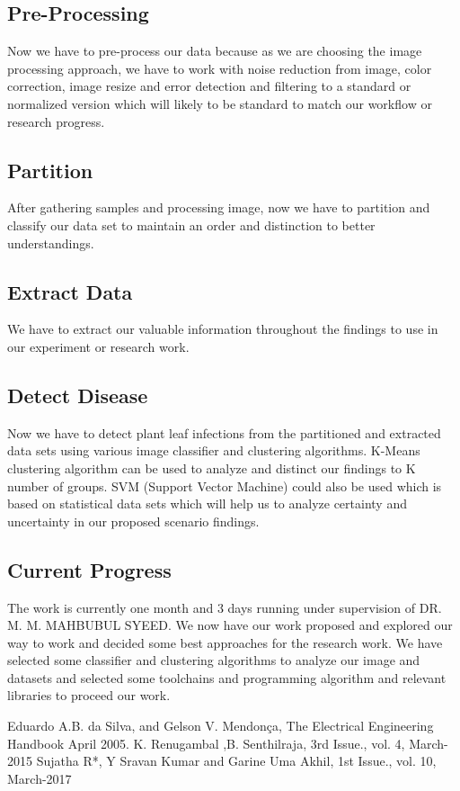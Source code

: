 \documentclass[conference]{IEEEtran}
\begin{document}
\subsection{Pre-Processing}
Now we have to pre-process our data because as we are choosing the image processing approach, we have to work with noise reduction from image, color correction, image resize and error detection and filtering to a standard or normalized version which will likely to be standard to match our workflow or research progress.



\subsection{Partition}
After gathering samples and processing image, now we have to partition and classify our data set to maintain an order and distinction to better understandings.

\subsection{Extract Data}
We have to extract our valuable information throughout the findings to use in our experiment or research work.


\subsection{Detect Disease}
Now we have to detect plant leaf infections from the partitioned and extracted data sets using various image classifier and clustering algorithms. K-Means clustering algorithm can be used to analyze and distinct our findings to K number of groups. SVM (Support Vector Machine) could also be used which is based on statistical data sets which will help us to analyze certainty and uncertainty in our proposed scenario findings.

\subsection{Current Progress }
The work is currently one month and 3 days running under supervision of DR. M. M. MAHBUBUL SYEED. We now have our work proposed and explored our way to work and decided some best approaches for the research work. We have selected some classifier and clustering algorithms to analyze our image and datasets and selected some toolchains and programming algorithm and relevant libraries to proceed our work.


\begin{thebibliography}{00}
 Eduardo A.B. da Silva, and Gelson V. Mendonça, The Electrical Engineering Handbook April 2005. 
 K. Renugambal ,B. Senthilraja, 3rd Issue., vol. 4, March-2015
 Sujatha R*, Y Sravan Kumar and Garine Uma Akhil, 1st Issue., vol. 10, March-2017
\end{thebibliography}
\vspace{12pt}
\color{red}
\end{document}
